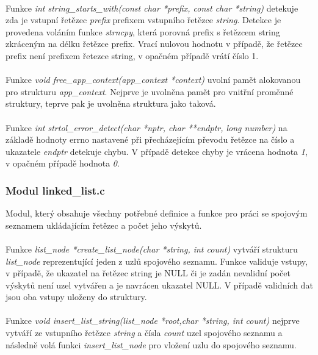 ﻿\documentclass[12pt, a4paper]{article}
\begin{document}
\paragraph{}
Funkce \textit{int string\_starts\_with(const char *prefix, const char *string)} detekuje zda je vstupní řetězec \textit{prefix} prefixem vstupního řetězce \textit{string}. Detekce je provedena voláním funkce \textit{strncpy}, která porovná prefix s řetězcem string zkráceným na délku řetězce prefix. Vrací nulovou hodnotu v případě, že řetězec prefix není prefixem řetezce string, v opačném případě vrátí číslo 1.

\paragraph{}
Funkce \textit{void free\_app\_context(app\_context *context)} uvolní pamět alokovanou pro strukturu \textit{app\_context}. Nejprve je uvolněna pamět pro vnitřní proměnné struktury, teprve pak je uvolněna struktura jako taková.
  
\paragraph{}
Funkce \textit{int strtol\_error\_detect(char *nptr, char **endptr, long number)} na základě hodnoty errno nastavené při přecházejícím převodu řetězce na číslo a ukazatele \textit{endptr} detekuje chybu. V případě detekce chyby je vrácena hodnota \textit{1}, v opačném případě hodnota \textit{0}.

\subsubsection{Modul linked\_list.c}
Modul, který obsahuje všechny potřebné definice a funkce pro práci se spojovým seznamem ukládajícím řetězec a počet jeho výskytů.

\paragraph{}
Funkce \textit{list\_node *create\_list\_node(char *string, int count)} vytváří strukturu \textit{list\_node} reprezentující jeden z uzlů spojového seznamu. Funkce validuje vstupy, v případě, že ukazatel na řetězec string je NULL či je zadán nevalidní počet výskytů není uzel vytvářen a je navrácen ukazatel NULL. V případě validních dat jsou oba vstupy uloženy do struktury.

\paragraph{}
Funkce \textit{void insert\_list\_string(list\_node *root,char *string, int count)} nejprve vytváří ze vstupního řetězce \textit{string} a čísla \textit{count} uzel spojového seznamu a následně volá funkci \textit{insert\_list\_node} pro vložení uzlu do spojového seznamu.
\end{document}
